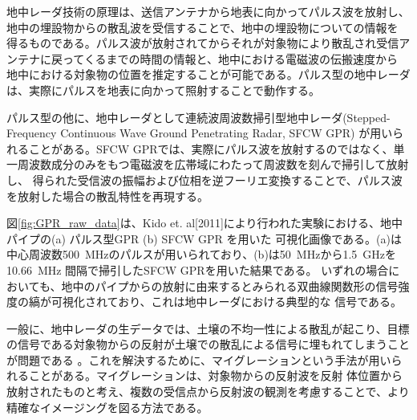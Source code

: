 \documentclass[11pt,a4paper,uplatex]{ujarticle}
\begin{document}
    地中レーダ技術の原理は、送信アンテナから地表に向かってパルス波を放射し、地中の埋設物からの散乱波を受信することで、地中の埋設物についての情報を
    得るものである。パルス波が放射されてからそれが対象物により散乱され受信アンテナに戻ってくるまでの時間の情報と、地中における電磁波の伝搬速度から
    地中における対象物の位置を推定することが可能である。パルス型の地中レーダは、実際にパルスを地表に向かって照射することで動作する。

    パルス型の他に、地中レーダとして連続波周波数掃引型地中レーダ(Stepped-Frequency Continuous Wave Ground Penetrating Radar, SFCW GPR)
    が用いられることがある。SFCW GPRでは、実際にパルス波を放射するのではなく、単一周波数成分のみをもつ電磁波を広帯域にわたって周波数を刻んで掃引して放射し、
    得られた受信波の振幅および位相を逆フーリエ変換することで、パルス波を放射した場合の散乱特性を再現する\cite{stepped_frequency_continuous_wave}。

    図\ref{fig:GPR_raw_data}は、Kido et. al[2011]により行われた実験\cite{STFW_Kido}における、地中パイプの(a) パルス型GPR (b) SFCW GPR を用いた
    可視化画像である。(a)は中心周波数500~MHzのパルスが用いられており、(b)は50~MHzから1.5~GHzを10.66~MHz
    間隔で掃引したSFCW GPRを用いた結果である。
    いずれの場合においても、地中のパイプからの放射に由来するとみられる双曲線関数形の信号強度の縞が可視化されており、これは地中レーダにおける典型的な
    信号である。

    一般に、地中レーダの生データでは、土壌の不均一性による散乱が起こり、目標の信号である対象物からの反射が土壌での散乱による信号に埋もれてしまうことが問題である
    \cite{prestack_migration}。これを解決するために、マイグレーションという手法が用いられることがある。マイグレーションは、対象物からの反射波を反射
    体位置から放射されたものと考え、複数の受信点から反射波の観測を考慮することで、より精確なイメージングを図る方法である\cite{gpr_migration}。
\end{document}
